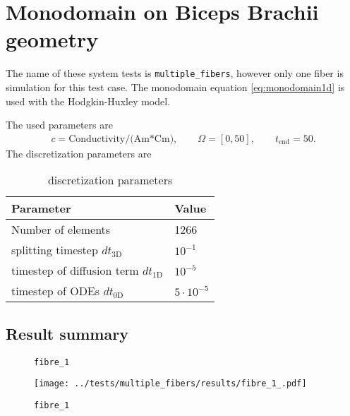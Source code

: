 %
\clearpage
%
\section{Monodomain on Biceps Brachii geometry}
  The name of these system tests is \lstinline{multiple_fibers}, however only one fiber is simulation for this test case.
  The monodomain equation \eqref{eq:monodomain1d} is used with the Hodgkin-Huxley model.
  
  The used parameters are
  \begin{equation*}
    \begin{array}{lll}
      c = \text{Conductivity/(Am*Cm)},\qquad \Omega = [0,50], \qquad t_\text{end}=50.
    \end{array}
  \end{equation*}
  The discretization parameters are
  \begin{table}[h!]
    \begin{center}
      \begin{tabular}{l|l}
        \textbf{Parameter} & \textbf{Value}\\
        \hline
        Number of elements & 1266\\
        splitting timestep $dt_\text{3D}$ & $10^{-1}$\\
        timestep of diffusion term $dt_\text{1D}$ & $10^{-5}$\\
        timestep of ODEs $dt_\text{0D}$ & $5\cdot 10^{-5}$
      \end{tabular}
    \end{center}
    \caption{discretization parameters}
    \label{tab:table_monodomain2}
  \end{table}

\subsection{Result summary}
%
\begin{figure}[h!]
  \caption{\lstinline{fibre_1}}
\end{figure} 
%
\begin{figure}[t]%
  \centering%
  \texttt{[image: ../tests/multiple\_fibers/results/fibre\_1\_.pdf]}%
  \caption{\lstinline{fibre_1}}
\end{figure}%
%


%
